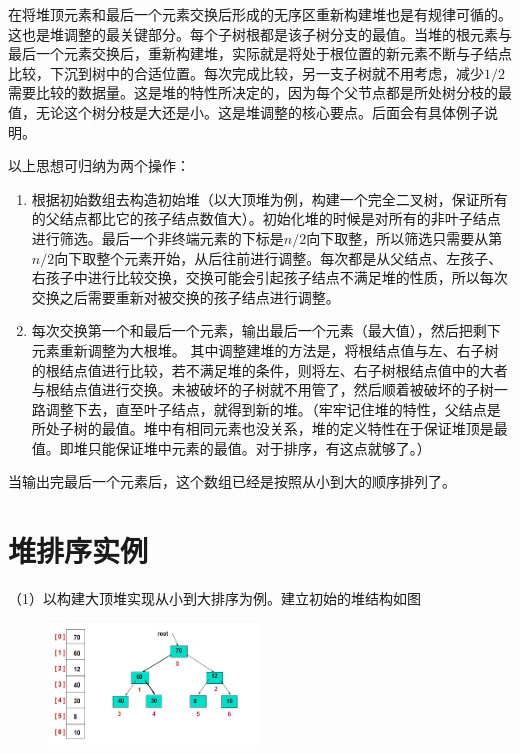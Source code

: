 在将堆顶元素和最后一个元素交换后形成的无序区重新构建堆也是有规律可循的。这也是堆调整的最关键部分。每个子树根都是该子树分支的最值。当堆的根元素与最后一个元素交换后，重新构建堆，实际就是将处于根位置的新元素不断与子结点比较，下沉到树中的合适位置。每次完成比较，另一支子树就不用考虑，减少$1/2$需要比较的数据量。这是堆的特性所决定的，因为每个父节点都是所处树分枝的最值，无论这个树分枝是大还是小。这是堆调整的核心要点。后面会有具体例子说明。



以上思想可归纳为两个操作：
\begin{enumerate}[(1)]
\item 根据初始数组去构造初始堆（以大顶堆为例，构建一个完全二叉树，保证所有的父结点都比它的孩子结点数值大）。初始化堆的时候是对所有的非叶子结点进行筛选。最后一个非终端元素的下标是$n/2$向下取整，所以筛选只需要从第$n/2$向下取整个元素开始，从后往前进行调整。每次都是从父结点、左孩子、右孩子中进行比较交换，交换可能会引起孩子结点不满足堆的性质，所以每次交换之后需要重新对被交换的孩子结点进行调整。
\item 每次交换第一个和最后一个元素，输出最后一个元素（最大值），然后把剩下元素重新调整为大根堆。
其中调整建堆的方法是，将根结点值与左、右子树的根结点值进行比较，若不满足堆的条件，则将左、右子树根结点值中的大者与根结点值进行交换。未被破坏的子树就不用管了，然后顺着被破坏的子树一路调整下去，直至叶子结点，就得到新的堆。（牢牢记住堆的特性，父结点是所处子树的最值。堆中有相同元素也没关系，堆的定义特性在于保证堆顶是最值。即堆只能保证堆中元素的最值。对于排序，有这点就够了。）
\end{enumerate}
当输出完最后一个元素后，这个数组已经是按照从小到大的顺序排列了。



\newpage
\section{堆排序实例}
（1）以构建大顶堆实现从小到大排序为例。建立初始的堆结构如图
\begin{figure}[h]
\begin{center}
\includegraphics[width=0.5\textwidth]{pictures/2012113021435914.png}
\end{center}
\end{figure}


